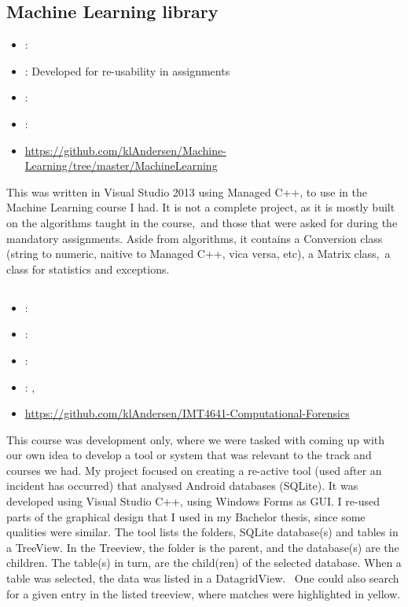 \subsection{Machine Learning library}
\label{sec:ml_library}
\begin{itemize} 
	\item {}: 
	\item {}: Developed for re-usability in assignments
	\item {}: 
	\item {}: 
	\item {} \url{https://github.com/klAndersen/Machine-Learning/tree/master/MachineLearning}
\end{itemize} 
This was written in Visual Studio 2013 using Managed C++, to use in the Machine Learning course I had. 
It is not a complete project, as it is mostly built on the algorithms taught in the course, and those that were asked for during the mandatory assignments. 
Aside from algorithms, it contains a Conversion class (string to numeric, naitive to Managed C++, vica versa, etc), a Matrix class, a class for statistics and exceptions.

\subsection[Computational Forensics]{}
\label{sec:comp_forensics}
\begin{itemize} 
	\item {}: 
	\item {}: 
	\item {}: 
	\item {}: , 
	\item {} \url{https://github.com/klAndersen/IMT4641-Computational-Forensics}
\end{itemize} 
This course was development only, where we were tasked with coming up with our own idea to develop a tool or system that was relevant to the track and courses we had.
My project focused on creating a re-active tool (used after an incident has occurred) that analysed Android databases (SQLite). 
It was developed using Visual Studio C++, using Windows Forms as GUI.
\vspace{0.5em}\newline
I re-used parts of the graphical design that I used in my Bachelor thesis, since some qualities were similar. 
The tool lists the folders, SQLite database(s) and tables in a TreeView.
In the Treeview, the folder is the parent, and the database(s) are the children. 
The table(s) in turn, are the child(ren) of the selected database. 
When a table was selected, the data was listed in a DatagridView. 
One could also search for a given entry in the listed treeview, where matches were highlighted in yellow.

